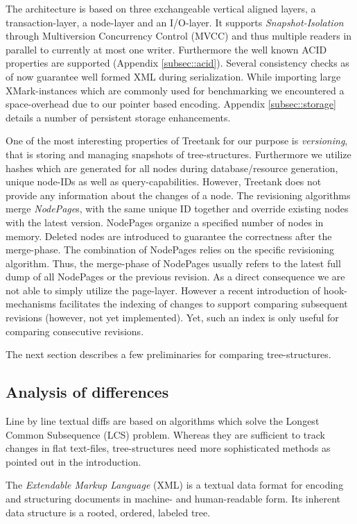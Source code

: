 The architecture is based on three exchangeable vertical aligned layers, a transaction-layer, a node-layer and an I/O-layer. It supports \emph{Snapshot-Isolation} through Multiversion Concurrency Control (MVCC) and thus multiple readers in parallel to currently at most one writer. Furthermore the well known ACID properties are supported (Appendix \ref{subsec::acid}). Several consistency checks as of now guarantee well formed XML during serialization. While importing large XMark-instances \cite{XMark} which are commonly used for benchmarking we encountered a space-overhead due to our pointer based encoding. Appendix \ref{subsec::storage} details a number of persistent storage enhancements.

One of the most interesting properties of Treetank for our purpose is \emph{versioning}, that is storing and managing snapshots of tree-structures. Furthermore we utilize hashes which are generated for all nodes during database/resource generation, unique node-IDs as well as query-capabilities. However, Treetank does not provide any information about the changes of a node. The revisioning algorithms merge \emph{NodePage}s, with the same unique ID together and override existing nodes with the latest version. NodePages organize a specified number of nodes in memory. Deleted nodes are introduced to guarantee the correctness after the merge-phase. The combination of NodePages relies on the specific revisioning algorithm. Thus, the merge-phase of NodePages usually refers to the latest full dump of all NodePages or the previous revision. As a direct consequence we are not able to simply utilize the page-layer. However a recent introduction of hook-mechanisms facilitates the indexing of changes to support comparing subsequent revisions (however, not yet implemented). Yet, such an index is only useful for comparing consecutive revisions.

The next section describes a few preliminaries for comparing tree-structures.

\subsection{Analysis of differences}
Line by line textual diffs are based on algorithms which solve the Longest Common Subsequence (LCS) problem. Whereas they are sufficient to track changes in flat text-files, tree-structures need more sophisticated methods as pointed out in the introduction.

The \emph{Extendable Markup Language} (XML) is a textual data format for encoding and structuring documents in machine- and human-readable form. Its inherent data structure is a rooted, ordered, labeled tree. 

